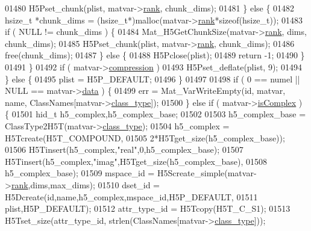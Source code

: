 \begin{DoxyCode}
{{01480             H5Pset\_chunk(plist, matvar->\hyperlink{group___m_a_t_a84ba70c96ded13cc555fa75b768d9921}{rank}, chunk\_dims);
01481         \} \textcolor{keywordflow}{else} \{
01482             hsize\_t *chunk\_dims = (hsize\_t*)malloc(matvar->\hyperlink{group___m_a_t_a84ba70c96ded13cc555fa75b768d9921}{rank}*\textcolor{keyword}{sizeof}(hsize\_t));
01483             \textcolor{keywordflow}{if} ( NULL != chunk\_dims ) \{
01484                 Mat\_H5GetChunkSize(matvar->\hyperlink{group___m_a_t_a84ba70c96ded13cc555fa75b768d9921}{rank}, dims, chunk\_dims);
01485                 H5Pset\_chunk(plist, matvar->\hyperlink{group___m_a_t_a84ba70c96ded13cc555fa75b768d9921}{rank}, chunk\_dims);
01486                 free(chunk\_dims);
01487             \} \textcolor{keywordflow}{else} \{
01488                 H5Pclose(plist);
01489                 \textcolor{keywordflow}{return} -1;
01490             \}
01491         \}
01492         \textcolor{keywordflow}{if} ( matvar->\hyperlink{group___m_a_t_aeef0466048621cb2c959ba7f6c774d06}{compression} )
01493             H5Pset\_deflate(plist, 9);
01494     \} \textcolor{keywordflow}{else} \{
01495         plist = H5P\_DEFAULT;
01496     \}
01497 
01498     \textcolor{keywordflow}{if} ( 0 == numel || NULL == matvar->\hyperlink{group___m_a_t_a5672978efa230bbdecdf38ede781f7fa}{data} ) \{
01499         err = Mat\_VarWriteEmpty(\textcolor{keywordtype}{id}, matvar, name, ClassNames[matvar->\hyperlink{group___m_a_t_aff13035bf3265dd7d9425e5d40c839d4}{class\_type}]);
01500     \} \textcolor{keywordflow}{else} \textcolor{keywordflow}{if} ( matvar->\hyperlink{group___m_a_t_aeb03b3a69f108dc05470b00443a43739}{isComplex} ) \{
01501         hid\_t h5\_complex,h5\_complex\_base;
01502 
01503         h5\_complex\_base = ClassType2H5T(matvar->\hyperlink{group___m_a_t_aff13035bf3265dd7d9425e5d40c839d4}{class\_type});
01504         h5\_complex      = H5Tcreate(H5T\_COMPOUND,
01505                                     2*H5Tget\_size(h5\_complex\_base));
01506         H5Tinsert(h5\_complex,\textcolor{stringliteral}{"real"},0,h5\_complex\_base);
01507         H5Tinsert(h5\_complex,\textcolor{stringliteral}{"imag"},H5Tget\_size(h5\_complex\_base),
01508                   h5\_complex\_base);
01509         mspace\_id = H5Screate\_simple(matvar->\hyperlink{group___m_a_t_a84ba70c96ded13cc555fa75b768d9921}{rank},dims,max\_dims);
01510         dset\_id = H5Dcreate(\textcolor{keywordtype}{id},name,h5\_complex,mspace\_id,H5P\_DEFAULT,
01511                             plist,H5P\_DEFAULT);
01512         attr\_type\_id = H5Tcopy(H5T\_C\_S1);
01513         H5Tset\_size(attr\_type\_id, strlen(ClassNames[matvar->\hyperlink{group___m_a_t_aff13035bf3265dd7d9425e5d40c839d4}{class\_type}]));
}}
\end{DoxyCode}
